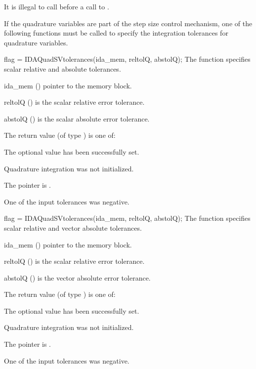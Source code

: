 {{  {\warn}It is illegal to call  before a call 
  to .
}


If the quadrature variables are part of the step size control mechanism, 
one of the following functions must be called to specify the
integration tolerances for quadrature variables. 

{
 flag = IDAQuadSVtolerances(ida\_mem, reltolQ, abstolQ);
}
{
  The function  specifies scalar relative and absolute
  tolerances.
}
{
  \begin{args}
  \item[ida\_mem] ()
    pointer to the {\idas} memory block.
  \item[reltolQ] ()
    is the scalar relative error tolerance.
  \item[abstolQ] ()
    is the scalar absolute error tolerance.
  \end{args}
}
{
  The return value  (of type ) is one of:
  \begin{args}
  \item[\Id{IDA\_SUCCESS}] 
    The optional value has been successfully set.
  \item[\Id{IDA\_NO\_QUAD}]
    Quadrature integration was not initialized.
  \item[\Id{IDA\_MEM\_NULL}]
    The  pointer is .
  \item[\Id{IDA\_ILL\_INPUT}] 
    One of the input tolerances was negative.
  \end{args}
}
{}

{
 flag = IDAQuadSVtolerances(ida\_mem, reltolQ, abstolQ);
}
{
  The function  specifies scalar relative and 
  vector absolute tolerances.
}
{
  \begin{args}
  \item[ida\_mem] ()
    pointer to the {\idas} memory block.
  \item[reltolQ] ()
    is the scalar relative error tolerance.
  \item[abstolQ] ()
    is the vector absolute error tolerance.
  \end{args}
}
{
  The return value  (of type ) is one of:
  \begin{args}
  \item[\Id{IDA\_SUCCESS}] 
    The optional value has been successfully set.
  \item[\Id{IDA\_NO\_QUAD}]
    Quadrature integration was not initialized.
  \item[\Id{IDA\_MEM\_NULL}]
    The  pointer is .
  \item[\Id{IDA\_ILL\_INPUT}] 
    One of the input tolerances was negative.
  \end{args}
}
{}

}
